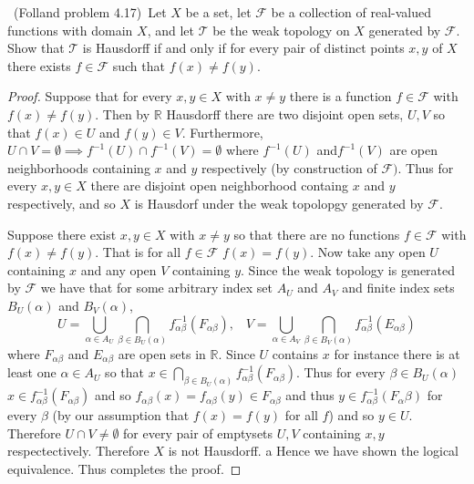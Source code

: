 \documentclass[11pt]{amsart}
\theoremstyle{definition}
\numberwithin{theorem}{section}
\numberwithin{definition}{section}
\numberwithin{equation}{section}
\def\scriptf{{\mathcal F}}
\def\scriptt{{\mathcal T}}
\begin{document}
\medskip {}\ (Folland problem 4.17)\ 
Let $X$ be a set, let $\scriptf$ be a collection of real-valued functions
with domain $X$, and let $\scriptt$ be the weak topology 
on $X$ generated by $\scriptf$.
Show that $\scriptt$ is Hausdorff if and only if 
for every pair of distinct points $x,y$ of $X$ there exists
$f\in\scriptf$ such that $f(x)\ne f(y)$.
\begin{proof}
		Suppose that for every $x, y \in X$ with $x \neq y$ there is a function $f \in \scriptf$ with $f(x) \neq f(y).$ Then by $\mathbb{R}$ Hausdorff there are two disjoint open sets, $U,V$ so that $f(x) \in U$ and $f(y) \in V$. Furthermore, 
		$U \cap V = \emptyset \implies f^{-1}(U) \cap f^{-1}(V) = \emptyset$ where $f^{-1}(U)$ and$ f^{-1}(V)$ are open neighborhoods containing $x $ and $ y$ respectively (by construction of $\scriptf)$. Thus for every $x, y \in X$ there are disjoint open neighborhood containg $x$ and $y$ respectively, and so $X$ is Hausdorf under the weak topolopgy generated by $\scriptf.$

		Suppose there exist $x,y \in X$ with $x \neq y$ so that there are no functions $f \in \scriptf$ with $f(x) \neq f(y)$. That is for all $f \in \scriptf$
		$f(x) = f(y).$ Now take any open $U$ containing $x$ and any open $V$ containing $y$. Since the weak topology is generated by $\scriptf$ we have that for some arbitrary index set $A_U$ and $A_V$ and finite index sets $B_U(\alpha)$ and  $B_V(\alpha)$,
		\begin{equation*}
			U = \bigcup_{\alpha\in A_U} \bigcap_{\beta\in B_U(\alpha)} f^{-1}_{\alpha\beta}(F_{\alpha\beta}), \;\;\; V = \bigcup_{\alpha\in A_V} \bigcap_{\beta\in B_V(\alpha)}f^{-1}_{\alpha\beta}(E_{\alpha\beta}) 
		\end{equation*}
		where $F_{\alpha\beta}$ and $E_{\alpha\beta}$ are open sets in $\mathbb{R}$. Since $U$ contains $x$ for instance there is at least one $\alpha \in A_U$ so that $x \in \bigcap_{\beta\in B_U(\alpha)} f^{-1}_{\alpha\beta}(F_{\alpha\beta}).$ Thus for every $\beta \in B_U(\alpha)$ $x \in f^{-1}_{\alpha\beta}(F_{\alpha\beta})$ and so $f_{\alpha\beta}(x) = f_{\alpha\beta}(y) \in F_{\alpha\beta}$ and thus $y \in f^{-1}_{\alpha\beta}(F_\alpha\beta)$ for every $\beta$ (by our assumption that $f(x) = f(y)$ for all $f$) and so $y \in U$. Therefore $U \cap V \neq \emptyset$ for every pair of emptysets $U,V$ containing $x,y$ respectectively. Therefore $X$ is not Hausdorff.
a
		Hence we have shown the logical equivalence. Thus completes the proof.
\end{proof}
\end{document}
